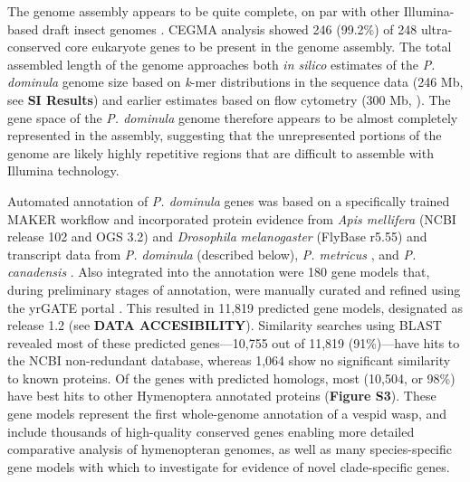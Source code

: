 The genome assembly appears to be quite complete, on par with other
Illumina-based draft insect genomes \cite{Bonasio2010,Nygaard2011}. CEGMA
analysis \cite{CEGMA}
showed 246 (99.2\%) of 248 ultra-conserved core eukaryote genes to be
present in the genome assembly. The total assembled length of the genome
approaches both \textit{in silico} estimates of the \textit{P. dominula}
genome size based on \textit{k}-mer distributions in the sequence data
(246 Mb, see \textbf{SI Results}) and earlier estimates based on flow
cytometry (300 Mb, \cite{Johnston2004}). The gene space of the \textit{P. dominula} genome
therefore appears to be almost completely represented in the assembly,
suggesting that the unrepresented portions of the genome are likely
highly repetitive regions that are difficult to assemble with Illumina
technology.

Automated annotation of \textit{P. dominula} genes was based on a
specifically trained MAKER workflow \cite{Maker} and
incorporated protein evidence from \textit{Apis mellifera} (NCBI release
102 and OGS 3.2) and \textit{Drosophila} \textit{melanogaster} (FlyBase
r5.55) and transcript data from \textit{P. dominula} (described below),
\textit{P. metricus} \cite{Berens2015}, and \textit{P. canadensis}
\cite{PcanTrans}. Also
integrated into the annotation were 180 gene models that, during
preliminary stages of annotation, were manually curated and refined
using the yrGATE portal \cite{yrGATE}. This resulted in 11,819 predicted gene models,
designated as release 1.2 (see \textbf{DATA ACCESIBILITY}). Similarity
searches using BLAST revealed most of these predicted genes---10,755 out
of 11,819 (91\%)---have hits to the NCBI non-redundant database, whereas
1,064 show no significant similarity to known proteins. Of the genes
with predicted homologs, most (10,504, or 98\%) have best hits to other
Hymenoptera annotated proteins (\textbf{Figure S3}). These gene models
represent the first whole-genome annotation of a vespid wasp, and
include thousands of high-quality conserved genes enabling more detailed
comparative analysis of hymenopteran genomes, as well as many
species-specific gene models with which to investigate for evidence of
novel clade-specific genes.

